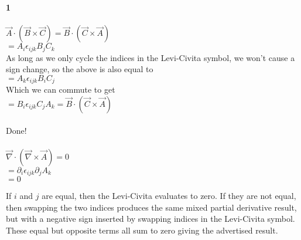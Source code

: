 \documentclass[prb,preprint]
{revtex4-1}
\begin{document}
{\bf 1}\\
\\
$\vec{A} \cdot \left(\vec{B} \times \vec{C}\right) = \vec{B} \cdot \left(\vec{C} \times \vec{A}\right)$
\\
$= A_i \epsilon_{ijk} B_j C_k$
\\
As long as we only cycle the indices in the Levi-Civita symbol, we won't cause a sign change, so the above is also equal to 
\\
$= A_k \epsilon_{ijk} B_i C_j$
\\
Which we can commute to get 
\\
$= B_i \epsilon_{ijk} C_j A_k = \vec{B} \cdot \left(\vec{C} \times \vec{A}\right)$
\\\\
Done!
\\\\
$\vec{\nabla} \cdot \left(\vec{\nabla} \times \vec{A} \right) = 0$
\\
$=\partial_i \epsilon_{ijk} \partial_j A_k$\\
$= 0$

If $i$ and $j$ are equal, then the Levi-Civita evaluates to zero.  If they are not equal, then swapping the two indices produces the same mixed partial derivative result, but with a negative sign inserted by swapping indices in the Levi-Civita symbol.  These equal but opposite terms all sum to zero giving the advertised result.
\\\\
\end{document}
